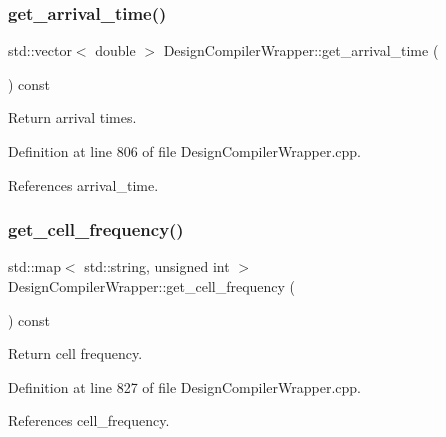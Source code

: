 \subsubsection{\texorpdfstring{get\+\_\+arrival\+\_\+time()}{get\_arrival\_time()}}
{\footnotesize\ttfamily std\+::vector$<$ double $>$ Design\+Compiler\+Wrapper\+::get\+\_\+arrival\+\_\+time (\begin{DoxyParamCaption}{ }\end{DoxyParamCaption}) const}



Return arrival times. 



Definition at line 806 of file Design\+Compiler\+Wrapper.\+cpp.



References arrival\+\_\+time.

\mbox{\label{classDesignCompilerWrapper_a667aebdb190c3208289a261358e1e2ca}} 
\subsubsection{\texorpdfstring{get\+\_\+cell\+\_\+frequency()}{get\_cell\_frequency()}}
{\footnotesize\ttfamily std\+::map$<$ std\+::string, unsigned int $>$ Design\+Compiler\+Wrapper\+::get\+\_\+cell\+\_\+frequency (\begin{DoxyParamCaption}{ }\end{DoxyParamCaption}) const}



Return cell frequency. 



Definition at line 827 of file Design\+Compiler\+Wrapper.\+cpp.



References cell\+\_\+frequency.

\mbox{\label{classDesignCompilerWrapper_ab41a5f45b89b2243fb7c6b380a8bbccd}} 
